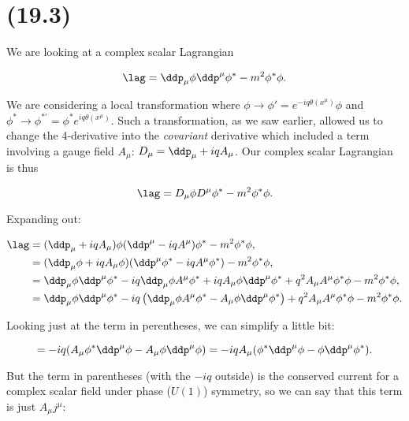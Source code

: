 \section{(19.3)}

\begin{parts}

\item We are looking at a complex scalar Lagrangian
    
\begin{equation}
    \lag = \ddp_{\mu}\phi\ddp^{\mu}\phi^* - m^2\phi^*\phi.
\end{equation}

We are considering a local transformation where $\phi \rightarrow \phi' = e^{-iq\theta(x^{\mu})}\phi$ and $\phi^* \rightarrow \phi^{*\prime} = \phi^*e^{iq\theta(x^{\mu})}$. Such a transformation, as we saw earlier, allowed us to change the 4-derivative into the \textit{covariant} derivative which included a term involving a gauge field $A_{\mu}$: $D_{\mu} = \ddp_{\mu} + iqA_{\mu}$. Our complex scalar Lagrangian is thus

\begin{equation}
    \lag = D_{\mu}\phi D^{\mu}\phi^* - m^2\phi^*\phi.
\end{equation}

Expanding out:

\begin{align*}
    \lag &= (\ddp_{\mu} + iqA_{\mu})\phi(\ddp^{\mu} - iqA^{\mu})\phi^* - m^2\phi^*\phi, \\
    &= (\ddp_{\mu}\phi + iqA_{\mu}\phi)(\ddp^{\mu}\phi^* - iqA^{\mu}\phi^*) - m^2\phi^*\phi, \\
    &= \ddp_{\mu}\phi\ddp^{\mu}\phi^* - iq\ddp_{\mu}\phi A^{\mu}\phi^* + iqA_{\mu}\phi\ddp^{\mu}\phi^* + q^2A_{\mu}A^{\mu}\phi^*\phi - m^2\phi^*\phi, \\
    &= \ddp_{\mu}\phi\ddp^{\mu}\phi^* -iq\left( \ddp_{\mu}\phi A^{\mu}\phi^* - A_{\mu}\phi\ddp^{\mu}\phi^* \right) + q^2A_{\mu}A^{\mu}\phi^*\phi - m^2\phi^*\phi.
\end{align*}

Looking just at the term in perentheses, we can simplify a little bit:

\begin{equation*}
    = -iq(A_{\mu}\phi^* \ddp^{\mu}\phi - A_{\mu}\phi\ddp^{\mu}\phi) = -iqA_{\mu}(\phi^*\ddp^{\mu}\phi - \phi\ddp^{\mu}\phi^*).
\end{equation*}

But the term in parentheses (with the $-iq$ outside) is the conserved current for a complex scalar field under phase ($U(1)$) symmetry, so we can say that this term is just $A_{\mu}j^{\mu}$:


\end{parts}
